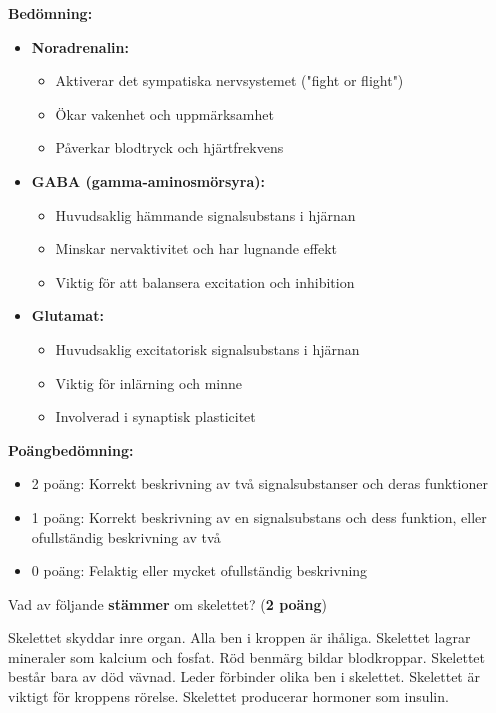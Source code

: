 \documentclass{exam}
\newenvironment{answer}
  {\begin{framed}\color{blue}\textbf{Bedömning:} }
  {\end{framed}}
\begin{document}
\begin{questions}
\begin{answer}
\begin{itemize}
  \item \textbf{Noradrenalin:}
  \begin{itemize}
    \item Aktiverar det sympatiska nervsystemet ("fight or flight")
    \item Ökar vakenhet och uppmärksamhet
    \item Påverkar blodtryck och hjärtfrekvens
  \end{itemize}
  
  \item \textbf{GABA (gamma-aminosmörsyra):}
  \begin{itemize}
    \item Huvudsaklig hämmande signalsubstans i hjärnan
    \item Minskar nervaktivitet och har lugnande effekt
    \item Viktig för att balansera excitation och inhibition
  \end{itemize}
  
  \item \textbf{Glutamat:}
  \begin{itemize}
    \item Huvudsaklig excitatorisk signalsubstans i hjärnan
    \item Viktig för inlärning och minne
    \item Involverad i synaptisk plasticitet
  \end{itemize}
\end{itemize}

\textbf{Poängbedömning:}
\begin{itemize}
  \item 2 poäng: Korrekt beskrivning av två signalsubstanser och deras funktioner
  \item 1 poäng: Korrekt beskrivning av en signalsubstans och dess funktion, eller ofullständig beskrivning av två
  \item 0 poäng: Felaktig eller mycket ofullständig beskrivning
\end{itemize}
\end{answer}
\vspace{5mm}

\question Vad av följande \textbf{stämmer} om skelettet? (\textbf{2 poäng})
\begin{checkboxes}
    \choice \textcolor{blue}{\checkmark} Skelettet skyddar inre organ.
    \choice Alla ben i kroppen är ihåliga.
    \choice \textcolor{blue}{\checkmark} Skelettet lagrar mineraler som kalcium och fosfat.
    \choice \textcolor{blue}{\checkmark} Röd benmärg bildar blodkroppar.
    \choice Skelettet består bara av död vävnad.
    \choice \textcolor{blue}{\checkmark} Leder förbinder olika ben i skelettet.
    \choice \textcolor{blue}{\checkmark} Skelettet är viktigt för kroppens rörelse.
    \choice Skelettet producerar hormoner som insulin.
\end{checkboxes}


\end{questions}
\end{document}
